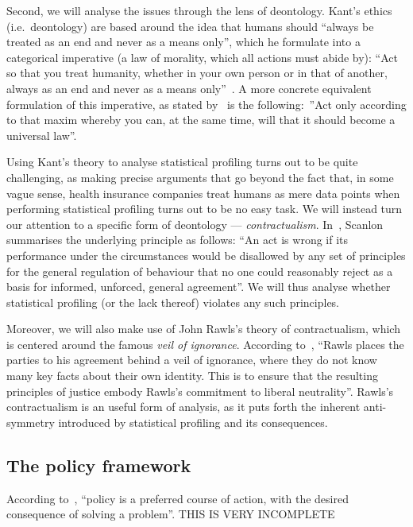 Second, we will analyse the issues through the lens of deontology. Kant's ethics (i.e.~deontology) are based around the idea that humans should ``always be treated as an end and never as a means only'', which he formulate into a categorical imperative (a law of morality, which all actions must abide by): ``Act so that you treat humanity, whether in your own person or in that of another, always as an end and never as a means only''~\cite[Chapter~10]{elemofmp}. A more concrete equivalent formulation of this imperative, as stated by~\cite[Section~4.2.1]{syllabus} is the following:~''Act only according to that maxim whereby you can, at the same time, will that it should become a universal law''.

Using Kant's theory to analyse statistical profiling turns out to be quite challenging, as making precise arguments that go beyond the fact that, in some vague sense, health insurance companies treat humans as mere data points when performing statistical profiling turns out to be no easy task. We will instead turn our attention to a specific form of deontology — \emph{contractualism}. In~\cite[Page~153]{what-we-owe}, Scanlon summarises the underlying principle as follows: ``An act is wrong if its performance under the circumstances would be disallowed by any set of principles for the general regulation of behaviour that no one could reasonably reject as a basis for informed, unforced, general agreement''. We will thus analyse whether statistical profiling (or the lack thereof) violates any such principles.

Moreover, we will also make use of John Rawls's theory of contractualism, which is centered around the famous \emph{veil of ignorance}. According to~\cite[Section~2]{sep-contractualism}, ``Rawls places the parties to his agreement behind a veil of ignorance, where they do not know many key facts about their own identity. This is to ensure that the resulting principles of justice embody Rawls’s commitment to liberal neutrality''. Rawls's contractualism is an useful form of analysis, as it puts forth the inherent anti-symmetry introduced by statistical profiling and its consequences.

\subsection{The policy framework}\label{sec:policy-framework}
According to~\cite{syllabus}, ``policy is a preferred course of action, with the desired consequence of solving a problem''. THIS IS VERY INCOMPLETE

